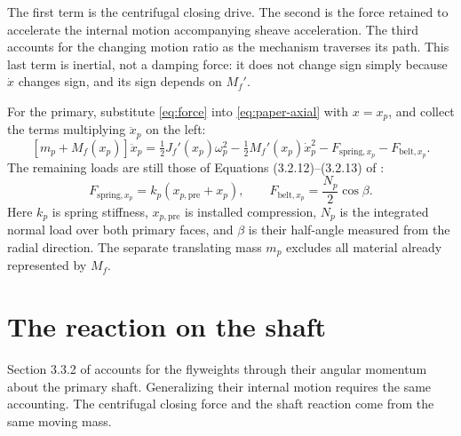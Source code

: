 \documentclass[11pt,letterpaper]{article}
\numberwithin{equation}{section}
\newcommand{\half}{\tfrac12}
\newcommand{\source}{\cite{formulation}}
\begin{document}
The first term is the centrifugal closing drive. The second is the force retained to accelerate the internal motion accompanying sheave acceleration. The third accounts for the changing motion ratio as the mechanism traverses its path. This last term is inertial, not a damping force: it does not change sign simply because $\dot x$ changes sign, and its sign depends on $M_f'$.

For the primary, substitute \cref{eq:force} into \cref{eq:paper-axial} with $x=x_p$, and collect the terms multiplying $\ddot x_p$ on the left:
\begin{equation}
  \boxed{[m_p+M_f(x_p)]\ddot x_p
      =\half J_f'(x_p)\omega_p^2-\half M_f'(x_p)\dot x_p^2
       -F_{\mathrm{spring},x_p}-F_{\mathrm{belt},x_p}.}
  \label{eq:completed-axial}
\end{equation}
The remaining loads are still those of Equations (3.2.12)--(3.2.13) of \source:
\begin{equation}
  F_{\mathrm{spring},x_p}=k_p(x_{p,\mathrm{pre}}+x_p),
  \qquad
  F_{\mathrm{belt},x_p}=\frac{N_p}{2}\cos\beta.
\end{equation}
Here $k_p$ is spring stiffness, $x_{p,\mathrm{pre}}$ is installed compression, $N_p$ is the integrated normal load over both primary faces, and $\beta$ is their half-angle measured from the radial direction. The separate translating mass $m_p$ excludes all material already represented by $M_f$.

\section{The reaction on the shaft}
\label{sec:shaft}

Section 3.3.2 of \source{} accounts for the flyweights through their angular momentum about the primary shaft. Generalizing their internal motion requires the same accounting. The centrifugal closing force and the shaft reaction come from the same moving mass.
\end{document}
